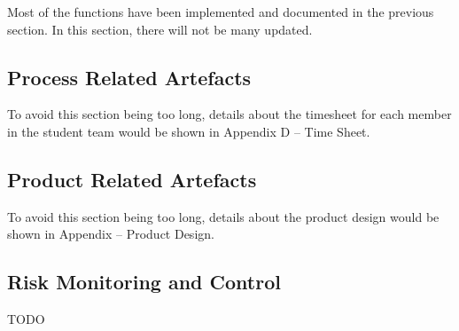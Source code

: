 Most of the functions have been implemented and documented in the previous section. In this section, there will not be many updated.

\subsection{Process Related Artefacts}
To avoid this section being too long, details about the timesheet for each member in the student team would be shown in Appendix D -- Time Sheet.

\subsection{Product Related Artefacts}
To avoid this section being too long, details about the product design would be shown in Appendix  -- Product Design.

\subsection{Risk Monitoring and Control}

TODO